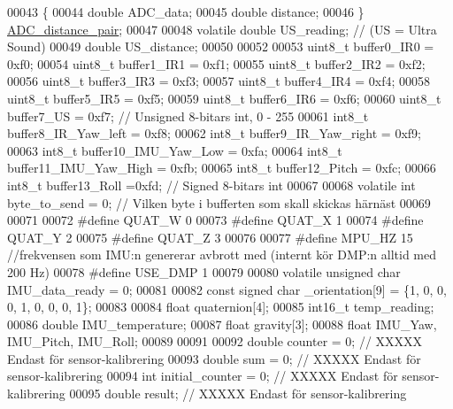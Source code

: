 \begin{DoxyCode}
00043 \{
00044     \textcolor{keywordtype}{double} ADC\_data;
00045     \textcolor{keywordtype}{double} distance;
00046 \} \hyperlink{struct_a_d_c__distance__pair}{ADC\_distance\_pair};
00047 
00048 \textcolor{keyword}{volatile} \textcolor{keywordtype}{double} US\_reading;                                 \textcolor{comment}{// (US = Ultra Sound)}
00049 \textcolor{keywordtype}{double} US\_distance;
00050 
00052 
00053 uint8\_t buffer0\_IR0 = 0xf0;
00054 uint8\_t buffer1\_IR1 = 0xf1;
00055 uint8\_t buffer2\_IR2 = 0xf2;
00056 uint8\_t buffer3\_IR3 = 0xf3;
00057 uint8\_t buffer4\_IR4 = 0xf4;
00058 uint8\_t buffer5\_IR5 = 0xf5;
00059 uint8\_t buffer6\_IR6 = 0xf6;
00060 uint8\_t buffer7\_US = 0xf7;      \textcolor{comment}{// Unsigned 8-bitars int, 0 - 255}
00061 int8\_t buffer8\_IR\_Yaw\_left = 0xf8;
00062 int8\_t buffer9\_IR\_Yaw\_right = 0xf9;
00063 int8\_t buffer10\_IMU\_Yaw\_Low = 0xfa;
00064 int8\_t buffer11\_IMU\_Yaw\_High = 0xfb;
00065 int8\_t buffer12\_Pitch = 0xfc;
00066 int8\_t buffer13\_Roll =0xfd;     \textcolor{comment}{// Signed 8-bitars int}
00067 
00068 \textcolor{keyword}{volatile} \textcolor{keywordtype}{int} byte\_to\_send = 0;          \textcolor{comment}{// Vilken byte i bufferten som skall skickas härnäst}
00069 
00071 
00072 \textcolor{preprocessor}{#define QUAT\_W 0}
00073 \textcolor{preprocessor}{#define QUAT\_X 1}
00074 \textcolor{preprocessor}{#define QUAT\_Y 2}
00075 \textcolor{preprocessor}{#define QUAT\_Z 3}
00076 
00077 \textcolor{preprocessor}{#define MPU\_HZ 15       //frekvensen som IMU:n genererar avbrott med (internt kör DMP:n alltid med 200 Hz)}
00078 \textcolor{preprocessor}{#define USE\_DMP 1}
00079 
00080 \textcolor{keyword}{volatile} \textcolor{keywordtype}{unsigned} \textcolor{keywordtype}{char} IMU\_data\_ready = 0;
00081 
00082 \textcolor{keyword}{const} \textcolor{keywordtype}{signed} \textcolor{keywordtype}{char} \_orientation[9] = \{1, 0, 0,  0, 1, 0,  0, 0, 1\};
00083 
00084 \textcolor{keywordtype}{float} quaternion[4];
00085 int16\_t temp\_reading;
00086 \textcolor{keywordtype}{double} IMU\_temperature;
00087 \textcolor{keywordtype}{float} gravity[3];
00088 \textcolor{keywordtype}{float} IMU\_Yaw, IMU\_Pitch, IMU\_Roll;
00089 
00091 
00092 \textcolor{keywordtype}{double} counter = 0;             \textcolor{comment}{// XXXXX Endast för sensor-kalibrering}
00093 \textcolor{keywordtype}{double} sum = 0;                 \textcolor{comment}{// XXXXX Endast för sensor-kalibrering}
00094 \textcolor{keywordtype}{int} initial\_counter = 0;        \textcolor{comment}{// XXXXX Endast för sensor-kalibrering}
00095 \textcolor{keywordtype}{double} result;                  \textcolor{comment}{// XXXXX Endast för sensor-kalibrering}

\end{DoxyCode}
